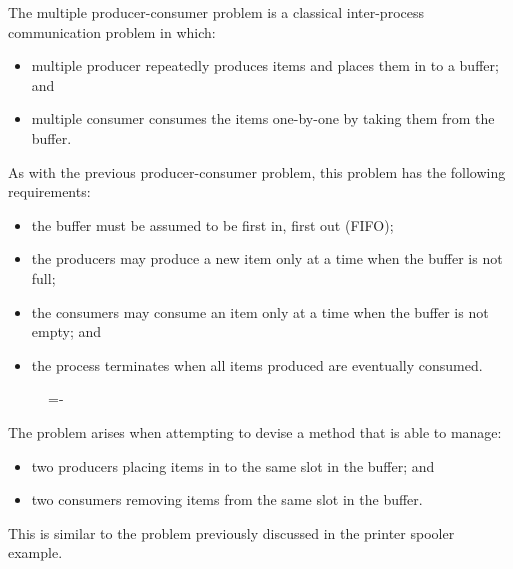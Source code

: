 \documentclass[a4paper]{systems-software}
\begin{document}
The multiple producer-consumer problem is a classical inter-process communication problem in which:
\begin{itemize}
	\item multiple producer repeatedly produces items and places them in to a buffer; and
	\item multiple consumer consumes the items one-by-one by taking them from the buffer.
\end{itemize}

As with the previous producer-consumer problem, this problem has the following requirements:
\begin{itemize}
	\item the buffer must be assumed to be first in, first out (FIFO);
	\item the producers may produce a new item only at a time when the buffer is not full;
	\item the consumers may consume an item only at a time when the buffer is not empty; and
	\item the process terminates when all items produced are eventually consumed.
\end{itemize}

\begin{figure}[H]
  \lineskip=-\fboxrule
\end{figure}

The problem arises when attempting to devise a method that is able to manage:
\begin{itemize}
	\item two producers placing items in to the same slot in the buffer; and
	\item two consumers removing items from the same slot in the buffer.
\end{itemize}
This is similar to the problem previously discussed in the printer spooler example.
\end{document}
